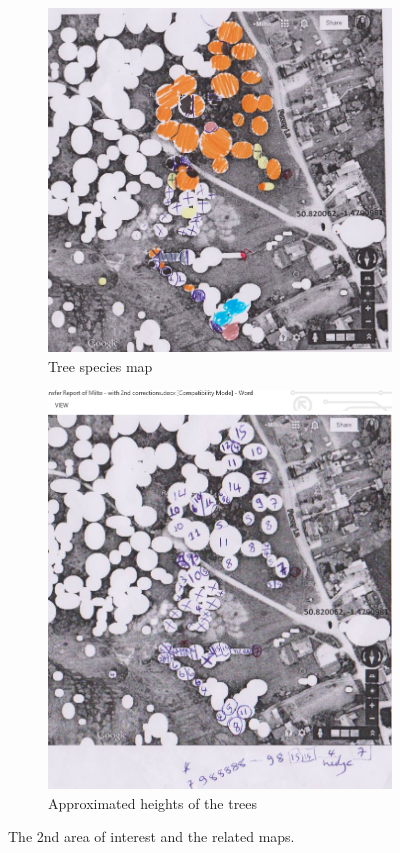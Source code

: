 \documentclass{subfiles}
\begin{document}
\begin{figure} [h!]
\begin{subfigure}[t]{.5\textwidth}
	   		\centering
	   		\includegraphics[width=.9\textwidth]{img/NewForest/Area2Fieldwork_Species}
	   		\caption{Tree species map}
	   		\label{fig:Area2Fieldwork_Species}
	   	\end{subfigure} \hfill
	   	\begin{subfigure}[t]{.5\textwidth}
	   		\centering
	   		\includegraphics[width=.9\textwidth]{img/NewForest/Area2Fieldwork_Heights}
	   		\caption{Approximated heights of the trees} 
	   		\label{fig:Area2Fieldwork_Heights}
	   	\end{subfigure}
	   	\caption{The 2nd area of interest and the related maps.} %
	   	\label{fig:NF_Area2} 
	   \end{figure}
	   
\end{document}
